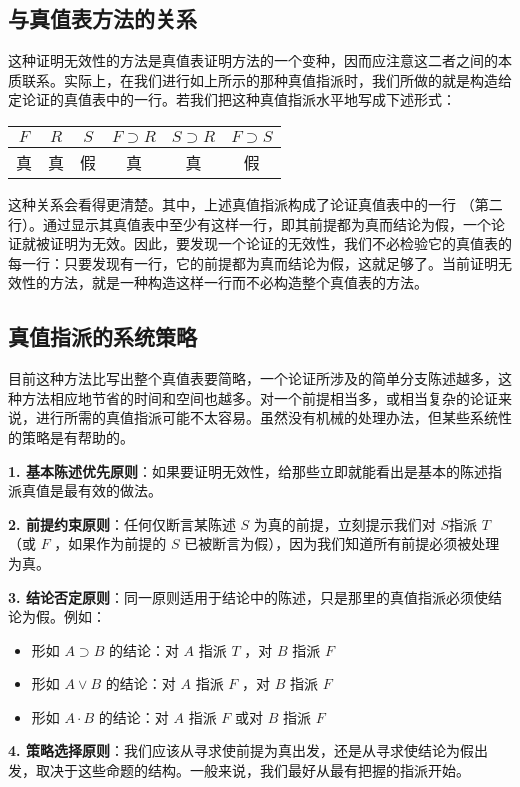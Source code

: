 \subsection{与真值表方法的关系}

这种证明无效性的方法是真值表证明方法的一个变种，因而应注意这二者之间的本质联系。实际上，在我们进行如上所示的那种真值指派时，我们所做的就是构造给定论证的真值表中的一行。若我们把这种真值指派水平地写成下述形式：

\begin{center}
\begin{tabular}{|cccccc|}
\hline
$F$ & $R$ & $S$ & $F \supset R$ & $S \supset R$ & $F \supset S$ \\
\hline
真 & 真 & 假 & 真 & 真 & 假 \\
\hline
\end{tabular}
\end{center}

这种关系会看得更清楚。其中，上述真值指派构成了论证真值表中的一行 （第二行）。通过显示其真值表中至少有这样一行，即其前提都为真而结论为假，一个论证就被证明为无效。因此，要发现一个论证的无效性，我们不必检验它的真值表的每一行：只要发现有一行，它的前提都为真而结论为假，这就足够了。当前证明无效性的方法，就是一种构造这样一行而不必构造整个真值表的方法。\cite{jeffrey1967}

\subsection{真值指派的系统策略}

目前这种方法比写出整个真值表要简略，一个论证所涉及的简单分支陈述越多，这种方法相应地节省的时间和空间也越多。对一个前提相当多，或相当复杂的论证来说，进行所需的真值指派可能不太容易。虽然没有机械的处理办法，但某些系统性的策略是有帮助的。

\begin{theorembox}[title=真值指派的基本策略]
\textbf{1. 基本陈述优先原则}：如果要证明无效性，给那些立即就能看出是基本的陈述指派真值是最有效的做法。

\textbf{2. 前提约束原则}：任何仅断言某陈述 $S$ 为真的前提，立刻提示我们对 $S$指派 $T$（或 $F$ ，如果作为前提的 $S$ 已被断言为假），因为我们知道所有前提必须被处理为真。

\textbf{3. 结论否定原则}：同一原则适用于结论中的陈述，只是那里的真值指派必须使结论为假。例如：
\begin{itemize}
\item 形如 $A \supset B$ 的结论：对 $A$ 指派 $T$ ，对 $B$ 指派 $F$
\item 形如 $A \vee B$ 的结论：对 $A$ 指派 $F$ ，对 $B$ 指派 $F$
\item 形如 $A \cdot B$ 的结论：对 $A$ 指派 $F$ 或对 $B$ 指派 $F$
\end{itemize}

\textbf{4. 策略选择原则}：我们应该从寻求使前提为真出发，还是从寻求使结论为假出发，取决于这些命题的结构。一般来说，我们最好从最有把握的指派开始。
\end{theorembox}

